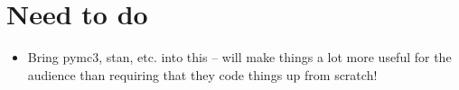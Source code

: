 \documentclass{article} %
\begin{document}
\section{Need to do}

\begin{itemize}
\item {}  Bring pymc3,  stan,  etc.  into this -- will make things a lot more useful for the audience than requiring that they code things up from scratch!
\end{itemize}

%


          
\end{document}
